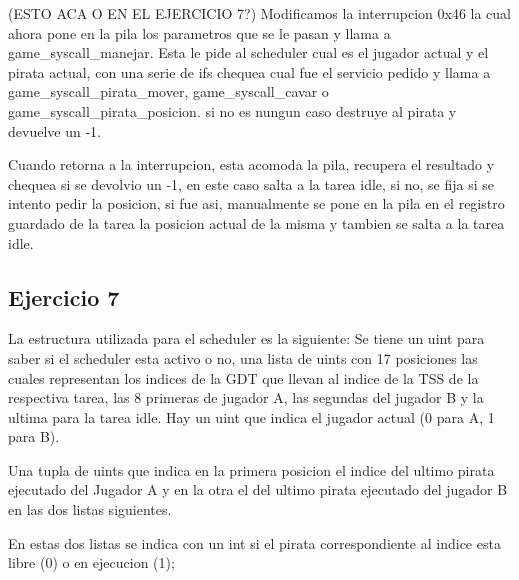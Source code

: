 (ESTO ACA O EN EL EJERCICIO 7?)
Modificamos la interrupcion 0x46 la cual ahora pone en la pila los parametros que se le pasan
y llama a game_syscall_manejar. Esta le pide al scheduler cual es el jugador actual y el pirata actual,
con una serie de ifs chequea cual fue el servicio pedido y llama a game_syscall_pirata_mover, game_syscall_cavar o
game_syscall_pirata_posicion. si no es nungun caso destruye al pirata y devuelve un -1.

Cuando retorna a la interrupcion, esta acomoda la pila, recupera el resultado y chequea si se devolvio un -1,
en este caso salta a la tarea idle, si no, se fija si se intento pedir la posicion, si fue asi, manualmente se
pone en la pila en el registro guardado de la tarea la posicion actual de la misma y tambien se salta a la tarea idle.



\subsection{Ejercicio 7}

La estructura utilizada para el scheduler es la siguiente:
  Se tiene un uint para saber si el scheduler esta activo o no, una lista de uints con 17 posiciones las cuales
  representan los indices de la GDT que llevan al indice de la TSS de la respectiva tarea, las 8 primeras de jugador A,
  las segundas del jugador B y la ultima para la tarea idle.
  Hay un uint que indica el jugador actual (0 para A, 1 para B).

Una tupla de uints que indica en la primera posicion el indice del ultimo pirata ejecutado del Jugador A y en la otra el del
ultimo pirata ejecutado del jugador B en las dos listas siguientes.

En estas dos listas se indica con un int si el pirata correspondiente al indice esta libre (0) o en ejecucion (1);

